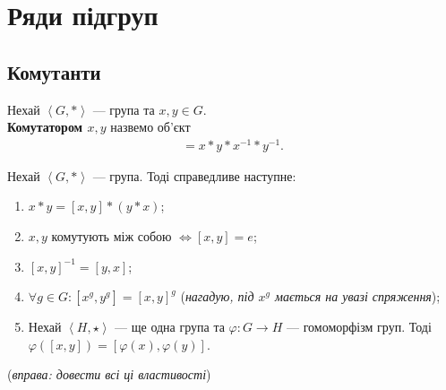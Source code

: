 \documentclass{math_library}
\begin{document}

\section{Ряди підгруп}
\subsection{Комутанти}
\begin{definition}
Нехай $\left<G,*\right>$ --- група та $x,y \in G$.\\
\textbf{Комутатором $x,y$} назвемо об'єкт
\begin{align*}
[x,y] = x*y*x^{-1}*y^{-1}.
\end{align*}
\end{definition}

\begin{proposition}
Нехай $\left< G,* \right>$ --- група. Тоді справедливе наступне:
\begin{enumerate}[nosep,wide=0pt,label={\arabic*)}]
\item $x*y = [x,y]*(y*x)$;
\item $x,y$ комутують між собою $\iff [x,y] = e$;
\item $[x,y]^{-1} = [y,x]$;
\item $\forall g \in G: [x^g,y^g] = [x,y]^g$ (\textit{нагадую, під $x^g$ мається на увазі спряження});
\item Нехай $\left< H,\star\right>$ --- ще одна група та $\varphi \colon G \to H$ --- гомоморфізм груп. Тоді $\varphi([x,y]) = [\varphi(x),\varphi(y)]$.
\end{enumerate}
(\textit{вправа: довести всі ці властивості})
\end{proposition}
\end{document}
